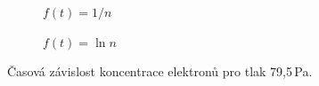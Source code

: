 \documentclass[a4paper,12pt]{article}
\begin{document}
\begin{figure}[h]
	\centering
	\begin{subfigure}[b]{.49\linewidth}
		\centering
		\caption{$f(t) = 1/n$}
	\end{subfigure}
	\begin{subfigure}[b]{.49\linewidth}
		\centering
		\caption{$f(t) = \ln n$}
	\end{subfigure}
	\caption{Časová závislost koncentrace elektronů pro tlak 79,5\,Pa.}
	\label{g:50Pa}
\end{figure}
\end{document}
